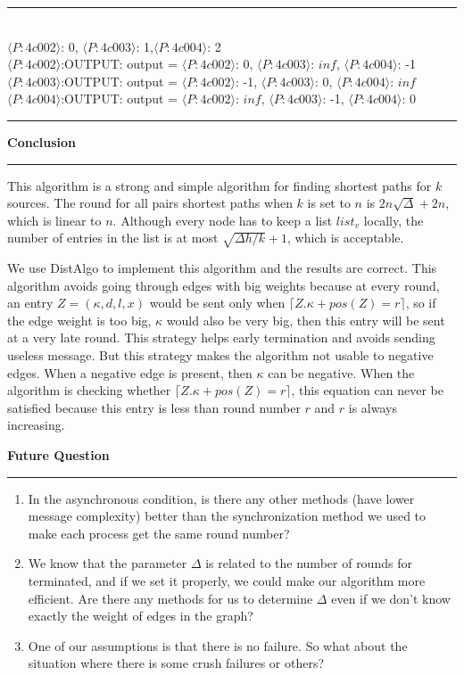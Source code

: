 \documentclass[11pt]{article}  %
\begin{document}
\noindent
\rule{5in}{.1pt}
\noindent \\
{$\langle P:4c002\rangle $: 0, $\langle P:4c003\rangle$: 1,$\langle P:4c004\rangle$: 2}\\
$\langle P:4c002\rangle$:OUTPUT: output = {$\langle P:4c002\rangle$: 0, $\langle P:4c003\rangle$: $inf$, $\langle P:4c004\rangle$: -1}\\
$\langle P:4c003\rangle$:OUTPUT: output = {$\langle P:4c002\rangle$: -1, $\langle P:4c003\rangle$: 0, $\langle P:4c004\rangle$: $inf$}\\
$\langle P:4c004\rangle$:OUTPUT: output = {$\langle P:4c002\rangle$: $inf$, $\langle P:4c003\rangle$: -1, $\langle P:4c004\rangle$: 0}\\
\rule{5in}{.1pt}\par


{\bf Conclusion}

\rule{6in}{.1pt}       %

This algorithm is a strong and simple algorithm for finding shortest paths for $k$ sources. The round for all pairs shortest paths when $k$ is set to $n$ is $2n\sqrt{\Delta} +2n$, which is linear to $n$. Although every node has to keep a list $list_v$ locally, the number of entries in the list is at most $\sqrt{\Delta h/k}+1$, which is acceptable.

We use DistAlgo to implement this algorithm and the results are correct. This algorithm avoids going through edges with big weights because at every round, an entry $Z=(\kappa, d, l, x)$ would be sent only when $\lceil Z.\kappa + pos(Z) = r \rceil $, so if the edge weight is too big, $\kappa$ would also be very big, then this entry will be sent at a very late round. This strategy helps early termination and avoids sending useless message. But this strategy makes the algorithm not usable to negative edges. When a negative edge is present, then $\kappa$ can be negative. When the algorithm is checking whether $\lceil Z.\kappa + pos(Z) = r \rceil $, this equation can never be satisfied because this entry is less than round number $r$ and $r$ is always increasing.

{\bf Future Question}

\rule{6in}{.1pt}       %

\begin{enumerate}
    \item In the asynchronous condition, is there any other methods (have lower message complexity) better than the synchronization method we used to make each process get the same round number?
    \item We know that the parameter $\Delta$ is related to the number of rounds for terminated, and if we set it properly, we could make our algorithm more efficient. Are there any methods for us to determine $\Delta$ even if we don't know exactly the weight of edges in the graph?
    \item One of our assumptions is that there is no failure. So what about the situation where there is some crush failures or others?

\end{enumerate}
\end{document}
